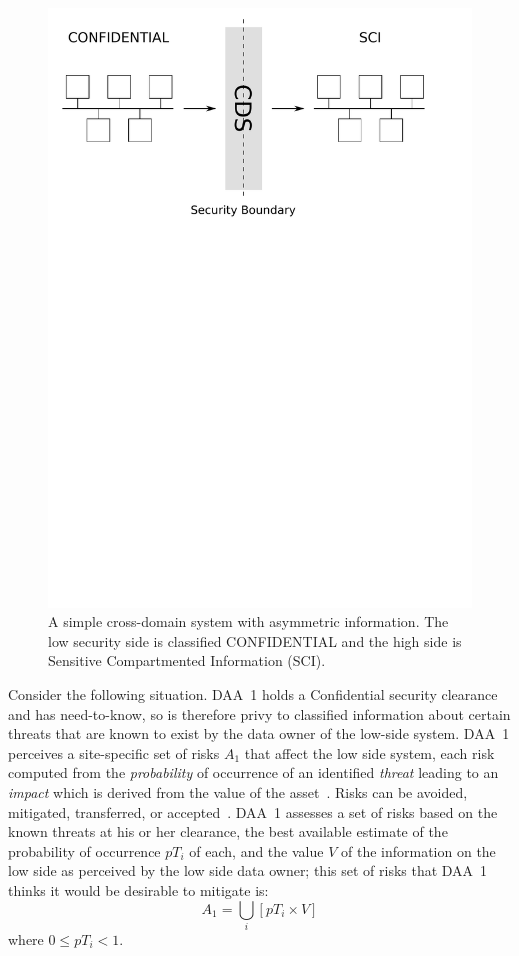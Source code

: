 \documentclass{llncs}
\begin{document}
\begin{figure}[htbp]
    \includegraphics[width=\textwidth,trim=0 19cm 2cm 0,clip]{simplest-possible-CDS.pdf}
    \caption{A simple cross-domain system with asymmetric information.  The low security side
		is classified CONFIDENTIAL and the high side is Sensitive Compartmented Information (SCI).}
    \label{figure:simplest-possible-CDS}
\end{figure}

Consider the following situation.  DAA~1 holds a Confidential security
clearance and has need-to-know, so is therefore privy to classified
information about certain threats that are known to exist by the data
owner of the low-side system.  DAA~1 perceives a site-specific set of
risks $A_1$ that affect the low side system, each risk computed from the \emph{probability} of
occurrence of an identified \emph{threat} leading to an \emph{impact} which is derived
from the value of the asset~\cite{Flechais2005}.
Risks can be avoided, mitigated, transferred, or accepted~\cite{Tockey2004}.
DAA~1 assesses
a set of risks based on the known threats at his or her clearance, the
best available estimate of the probability of
occurrence $pT_i$ of each, and the value $V$ of the information on the low side as
perceived by the low side data owner; this
set of risks that DAA~1 thinks it would be desirable to mitigate is:
\begin{equation}
A_1 = \bigcup_i[pT_i\times V]
\end{equation}
where $0 \leq pT_i < 1$.
\end{document}
